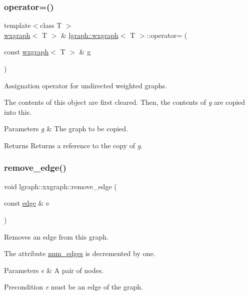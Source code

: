 \subsubsection{\texorpdfstring{operator=()}{operator=()}}
{\footnotesize\ttfamily template$<$class T $>$ \\
\hyperlink{classlgraph_1_1wxgraph}{wxgraph}$<$ T $>$ \& \hyperlink{classlgraph_1_1wxgraph}{lgraph\+::wxgraph}$<$ T $>$\+::operator= (\begin{DoxyParamCaption}\item[{const \hyperlink{classlgraph_1_1wxgraph}{wxgraph}$<$ T $>$ \&}]{g }\end{DoxyParamCaption})}



Assignation operator for undirected weighted graphs. 

The contents of this object are first cleared. Then, the contents of {\itshape g} are copied into this.


\begin{DoxyParams}{Parameters}
{\em g} & The graph to be copied. \\
\hline
\end{DoxyParams}
\begin{DoxyReturn}{Returns}
Returns a reference to the copy of {\itshape g}. 
\end{DoxyReturn}
\mbox{\label{classlgraph_1_1xxgraph_a46a75fa2a10a8674ab930e9dc766e2f9}} 
\subsubsection{\texorpdfstring{remove\+\_\+edge()}{remove\_edge()}\hspace{0.1cm}{\footnotesize\ttfamily [1/2]}}
{\footnotesize\ttfamily void lgraph\+::xxgraph\+::remove\+\_\+edge (\begin{DoxyParamCaption}\item[{const \hyperlink{namespacelgraph_a76bd7d50719f03de7a85db259d80d572}{edge} \&}]{e }\end{DoxyParamCaption})\hspace{0.3cm}{\ttfamily [inherited]}}



Removes an edge from this graph. 

The attribute \hyperlink{classlgraph_1_1xxgraph_a6765a9a3be42f6e0f824635c593b35d7}{num\+\_\+edges} is decremented by one. 
\begin{DoxyParams}{Parameters}
{\em e} & A pair of nodes. \\
\hline
\end{DoxyParams}
\begin{DoxyPrecond}{Precondition}
{\itshape e} must be an edge of the graph. 
\end{DoxyPrecond}
\mbox{\label{classlgraph_1_1xxgraph_a7fd3a1309cde4f408c8d9d4cb3b898a8}} 
